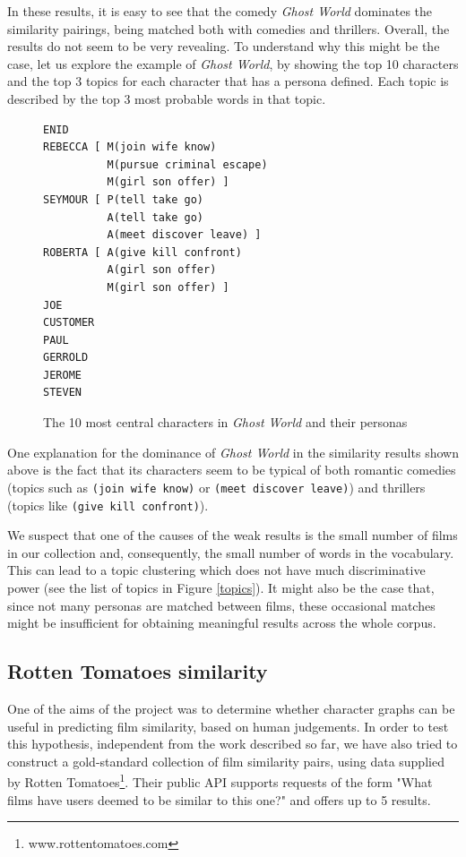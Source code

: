 \documentclass[bsc,frontabs,singlespacing,parskip]{infthesis} %
\begin{document}
In these results, it is easy to see that the comedy \textit{Ghost World} dominates the similarity pairings, being matched both with comedies and thrillers. Overall, the results do not seem to be very revealing. To understand why this might be the case, let us explore the example of \textit{Ghost World}, by showing the top 10 characters and the top 3 topics for each character that has a persona defined. Each topic is described by the top 3 most probable words in that topic.

\begin{figure}[h]
\centering
\begin{minipage}{9cm}
\begin{Verbatim}[frame=single]
ENID 
REBECCA [ M(join wife know)
          M(pursue criminal escape)
          M(girl son offer) ]
SEYMOUR [ P(tell take go)
          A(tell take go)
          A(meet discover leave) ]
ROBERTA [ A(give kill confront)
          A(girl son offer)
          M(girl son offer) ]
JOE 
CUSTOMER 
PAUL 
GERROLD 
JEROME 
STEVEN 
\end{Verbatim}

\end{minipage}
\caption{The 10 most central characters in \textit{Ghost World} and their personas}
\end{figure}

One explanation for the dominance of \textit{Ghost World} in the similarity results shown above is the fact that its characters seem to be typical of both romantic comedies (topics such as \texttt{(join wife know)} or \texttt{(meet discover leave)}) and thrillers (topics like \texttt{(give kill confront)}).

We suspect that one of the causes of the weak results is the small number of films in our collection and, consequently, the small number of words in the vocabulary. This can lead to a topic clustering which does not have much discriminative power (see the list of topics in Figure \ref{topics}). It might also be the case that, since not many personas are matched between films, these occasional matches might be insufficient for obtaining meaningful results across the whole corpus.

\subsection{Rotten Tomatoes similarity}
One of the aims of the project was to determine whether character graphs can be useful in predicting film similarity, based on human judgements. In order to test this hypothesis, independent from the work described so far, we have also tried to construct a gold-standard collection of film similarity pairs, using data supplied by Rotten Tomatoes\footnote{www.rottentomatoes.com}. Their public API supports requests of the form "What films have users deemed to be similar to this one?" and offers up to 5 results.
\end{document}
